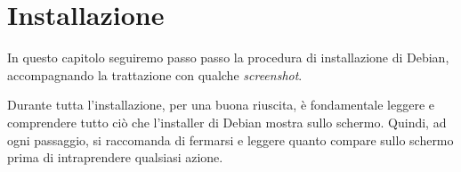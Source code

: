 \chapter{Installazione}\label{ch:install}
In questo capitolo seguiremo passo passo la procedura di installazione di Debian, accompagnando la trattazione con qualche \textit{screenshot}.

Durante tutta l'installazione, per una buona riuscita, è fondamentale leggere e comprendere tutto ciò che l'installer di Debian mostra sullo schermo. Quindi, ad ogni passaggio, si raccomanda di fermarsi e leggere quanto compare sullo schermo prima di intraprendere qualsiasi azione.








